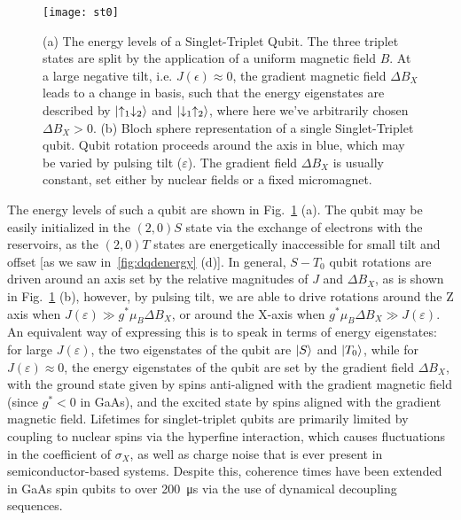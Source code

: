 \begin{figure}
\texttt{[image: st0]}
\caption[Energy levels and eigenstates of a Singlet-Triplet qubit]
{\label{fig:st0}(a) The energy levels of a Singlet-Triplet Qubit. The three triplet states are split by the application of a
uniform magnetic field $B$. At a large negative tilt, i.e. $J(\epsilon) \approx 0$, the gradient magnetic field $\Delta B_X$ leads to a
change in basis, such that the energy eigenstates are described by $\ket{\uparrow_1\downarrow_2}$ and $\ket{\downarrow_1\uparrow_2}$,
where here we've arbitrarily chosen $\Delta B_X > 0$.
(b) Bloch sphere representation of a single Singlet-Triplet qubit. Qubit rotation proceeds around the axis in blue,
which may be varied by pulsing tilt ($\varepsilon$). The gradient field $\Delta B_X$ is usually constant, set either
by nuclear fields or a fixed micromagnet.}
\end{figure}

The energy levels of such a qubit are shown in Fig.~\ref{fig:st0} (a). The qubit may be easily initialized in the $(2, 0)S$ state via
the exchange of electrons with the reservoirs, as the $(2, 0)T$ states are energetically inaccessible for small tilt and offset [as we
saw in~\ref{fig:dqdenergy} (d)]. In general, $S-T_0$ qubit rotations are driven around an axis set by the relative magnitudes
of $J$ and $\Delta B_X$, as is shown in Fig.~\ref{fig:st0} (b), however, by pulsing tilt, we are able to drive rotations around the Z axis
when $J(\varepsilon) \gg g^* \mu_B \Delta B_X$, or around the X-axis when $g^* \mu_B \Delta B_X \gg J(\varepsilon)$. An equivalent way of
expressing this is to speak in terms of energy eigenstates: for large $J(\varepsilon)$, the two eigenstates of the qubit are $\ket{S}$ and
$\ket{T_0}$, while for $J(\varepsilon) \approx 0$, the energy eigenstates of the qubit are set by the gradient field $\Delta B_X$, with
the ground state given by spins anti-aligned with the gradient magnetic field (since $g^* < 0$ in GaAs), and the excited state by spins aligned with
the gradient magnetic field. Lifetimes for singlet-triplet qubits are primarily limited by coupling to nuclear spins via the hyperfine
interaction\cite{nnano.2016.170}, which causes fluctuations in the coefficient of $\sigma_X$, as well as charge noise that is ever present
in semiconductor-based systems\cite{PhysRevLett.110.146804}. Despite this, coherence times have been extended in GaAs spin qubits to
over \SI{200}{\micro\second} via the use of dynamical decoupling sequences\cite{nphys1856}.

